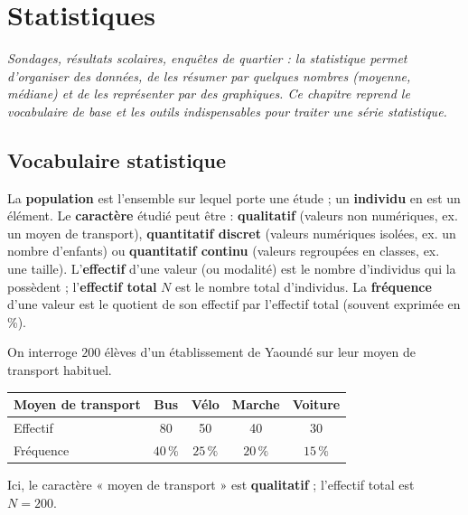 \chapter{Statistiques}

\noindent\textit{Sondages, résultats scolaires, enquêtes de quartier : la statistique
permet d'organiser des données, de les résumer par quelques nombres (moyenne, médiane) et
de les représenter par des graphiques. Ce chapitre reprend le vocabulaire de base et les
outils indispensables pour traiter une série statistique.}
\vspace{8pt}

\connecteBanner

\section{Vocabulaire statistique}

\begin{definition}
La \textbf{population} est l'ensemble sur lequel porte une étude ; un \textbf{individu} en
est un élément. Le \textbf{caractère} étudié peut être : \textbf{qualitatif} (valeurs non
numériques, ex. un moyen de transport), \textbf{quantitatif discret} (valeurs numériques
isolées, ex. un nombre d'enfants) ou \textbf{quantitatif continu} (valeurs regroupées en
classes, ex. une taille). L'\textbf{effectif} d'une valeur (ou modalité) est le nombre
d'individus qui la possèdent ; l'\textbf{effectif total} $N$ est le nombre total
d'individus. La \textbf{fréquence} d'une valeur est le quotient de son effectif par
l'effectif total (souvent exprimée en \%).
\end{definition}

\begin{exemple}
On interroge $200$ élèves d'un établissement de Yaoundé sur leur moyen de transport
habituel.
\begin{center}
\small
\begin{tabular}{lcccc}
\toprule
Moyen de transport & Bus & Vélo & Marche & Voiture \\
\midrule
Effectif & 80 & 50 & 40 & 30 \\
Fréquence & $40\,\%$ & $25\,\%$ & $20\,\%$ & $15\,\%$ \\
\bottomrule
\end{tabular}
\end{center}
Ici, le caractère « moyen de transport » est \textbf{qualitatif} ; l'effectif total est
$N=200$.
\end{exemple}

